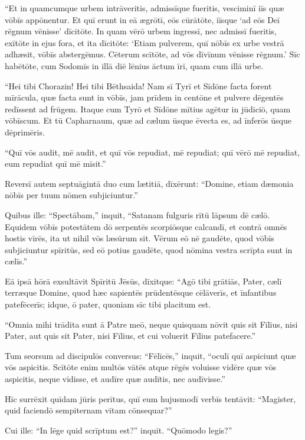 \Versus ``Et in quamcumque urbem intrāveritis, admissīque fueritis, vesciminī iīs quæ vōbīs appōnentur.
\Versus Et quī erunt in eā ægrōtī, eōs cūrātōte, iīsque `ad eōs Deī rēgnum vēnisse' dīcitōte.
\Versus In quam vērō urbem ingressī, nec admissī fueritis, exītōte in ejus fora, et ita dīcitōte:
\Versus `Etiam pulverem, quī nōbīs ex urbe vestrā adhæsit, vōbīs abstergēmus. Cēterum scītōte, ad vōs dīvīnum vēnisse rēgnum.'
\Versus Sīc habētōte, cum Sodomīs in illā diē lēnius āctum īrī, quam cum illā urbe.

\Versus ``Hei tibi Chorazin! Hei tibi Bēthsaida! Nam sī Tyrī et Sīdōne facta forent mīrācula, quæ facta sunt in vōbīs, jam prīdem in centōne et pulvere dēgentēs redīssent ad frūgem.
\Versus Itaque cum Tyrō et Sīdōne mītius agētur in jūdiciō, quam vōbīscum.
\Versus Et tū Capharnaum, quæ ad cælum ūsque ēvecta es, ad īnferōs ūsque dēprimēris.

\Versus ``Quī vōs audit, mē audit, et quī vōs repudiat, mē repudiat; quī vērō mē repudiat, eum repudiat quī mē mīsit.''

\Versus Reversī autem septuāgintā duo cum lætitiā, dīxērunt: ``Domine, etiam dæmonia nōbīs per tuum nōmen subjiciuntur.''

\Versus Quibus ille: ``Spectābam,'' inquit, ``Satanam fulguris rītū lāpsum dē cælō.
\Versus Equidem vōbīs potestātem dō serpentēs scorpiōsque calcandī, et contrā omnēs hostis vīrēs, ita ut nihil vōs læsūrum sit.
\Versus Vērum eō nē gaudēte, quod vōbīs subjiciuntur spīritūs, sed eō potius gaudēte, quod nōmina vestra scrīpta sunt in cælīs.''

\Versus Eā ipsā hōrā exsultāvit Spīritū Jēsūs, dīxitque: ``Agō tibi grātiās, Pater, cælī terræque Domine, quod hæc sapientēs prūdentēsque cēlāverīs, et īnfantibus patefēcerīs; idque, ō pater, quoniam sīc tibi placitum est.

\Versus ``Omnia mihi trādita sunt ā Patre meō, neque quisquam nōvit quis sit Fīlius, nisi Pater, aut quis sit Pater, nisi Fīlius, et cui voluerit Fīlius patefacere.''

\Versus Tum seorsum ad discipulōs conversus: ``Fēlīcēs,'' inquit, ``oculī quī aspiciunt quæ vōs aspicitis.
\Versus Scītōte enim multōs vātēs atque rēgēs voluisse vidēre quæ vōs aspicitis, neque vīdisse, et audīre quæ audītis, nec audīvisse.''

\Versus Hīc surrēxit quīdam jūris perītus, quī eum hujusmodī verbīs tentāvit: ``Magister, quid faciendō sempiternam vītam cōnsequar?''

\Versus Cui ille: ``In lēge quid scrīptum est?'' inquit. ``Quōmodo legis?''

